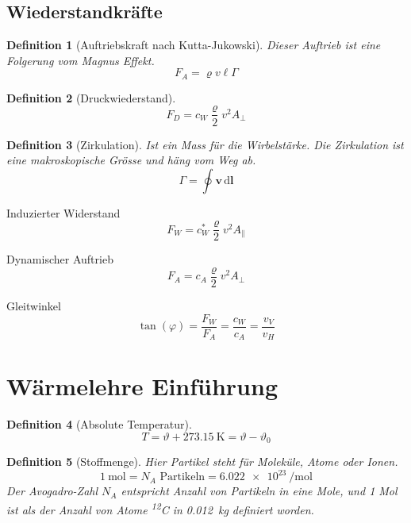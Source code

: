 \documentclass[a4paper, twocolumn]{article}
\numberwithin{equation}{section}
\theoremstyle{hsr-def}
\newtheorem{definition}{Definition}[section]
\theoremstyle{hsr-sub}
\newcommand{\dd}[1]{\ensuremath{\mathrm{d}#1}}
\newcommand{\di}[1]{\,\dd{#1}}
\renewcommand{\vec}[1]{\ensuremath{\mathbf{#1}}}
\begin{document}
\subsection{Wiederstandkr\"afte}
\begin{definition}[Auftriebskraft nach Kutta-Jukowski] Dieser Auftrieb ist eine Folgerung vom \emph{Magnus Effekt}.
\[
    F_A = \varrho v \ell \Gamma
\]
\end{definition}

\begin{definition}[Druckwiederstand]
\[
    F_D = c_W \frac{\varrho}{2}v^2 A_\perp
\]
\end{definition}

\begin{definition}[Zirkulation] Ist ein Mass f\"ur die Wirbelst\"arke.
Die Zirkulation ist eine makroskopische Gr\"osse und h\"ang vom Weg ab.
\[
    \Gamma = \oint \vec{v} \di{\vec{l}}
\]
\end{definition}

Induzierter Widerstand
\[
    F_W = c_W^* \frac{\varrho}{2} v^2 A_\parallel
\]

Dynamischer Auftrieb
\[
    F_A = c_A \frac{\varrho}{2} v^2 A_\perp
\]

Gleitwinkel
\[
    \tan(\varphi) = \frac{F_W}{F_A} = \frac{c_W}{c_A} = \frac{v_V}{v_H}
\]

\section{W\"armelehre Einf\"uhrung}
\begin{definition}[Absolute Temperatur]
\[
    T = \vartheta + \SI{273.15}{\kelvin} = \vartheta - \vartheta_0
\]
\end{definition}

\begin{definition}[Stoffmenge]
Hier \emph{Partikel} steht f\"ur Molek\"ule, Atome oder Ionen.
\[
    \SI{1}{\mole} = N_A \text{ Partikeln} = \SI{6.022e23}{\per\mole}
\]
Der Avogadro-Zahl \(N_A\) entspricht Anzahl von Partikeln in eine Mole, und 1 Mol ist als der Anzahl von Atome \textsuperscript{12}C in \SI{0.012}{\kilo\gram} definiert worden.
\end{definition}
\end{document}
